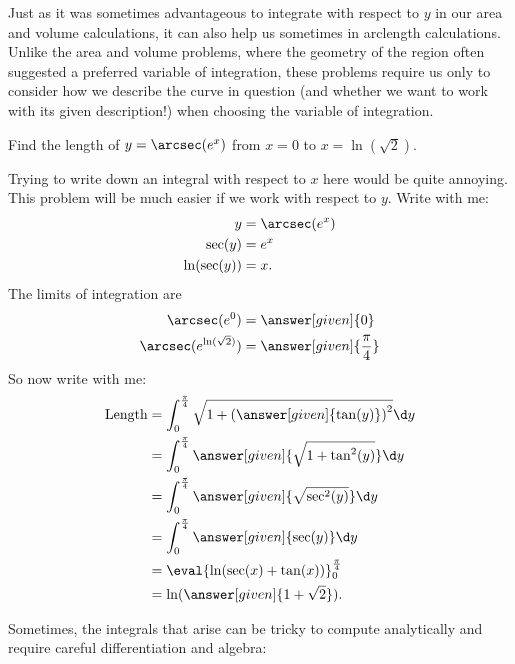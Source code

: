 \documentclass{ximera}
\begin{document}
Just as it was sometimes advantageous to integrate with respect to $y$ in our area and volume calculations, it can also help us sometimes in arclength calculations.  Unlike the area and volume problems, where the geometry of the region often suggested a preferred variable of integration, these problems require us only to consider how we describe the curve in question (and whether we want to work with its given description!) when choosing the variable of integration.
 
\begin{example}
  Find the length of $y = \arcsec(e^x)$ from $x= 0$ to
  $x=\ln(\sqrt{2})$.
  \begin{explanation}
    Trying to write down an integral with respect to $x$ here would be quite annoying.  This problem will be much easier if we work with respect to $y$. Write with me:
    \begin{align*}
      y &= \arcsec(e^x)\\
      \sec(y) &= e^x\\
      \ln(\sec(y)) &= x.
    \end{align*}
    The limits of integration are
    \begin{align*}
      \arcsec(e^0) &= \answer[given]{0}\\
      \arcsec(e^{\ln(\sqrt{2})}) &= \answer[given]{\frac{\pi}{4}}
    \end{align*}
    So now write with me:
    \begin{align*}
      \text{Length} &= \int_0^{\frac{\pi}{4}} \sqrt{1+\left( \answer[given]{\tan(y)} \right)^2} \d y\\
      &=\int_0^{\frac{\pi}{4}} \answer[given]{\sqrt{1+\tan^2(y)}}\d y\\
      &=\int_0^{\frac{\pi}{4}} \answer[given]{\sqrt{\sec^2(y)}}\d y\\
      &=\int_0^{\frac{\pi}{4}} \answer[given]{\sec(y)} \d y\\
      &=\eval{\ln(\sec(x)+\tan(x))}_0^\frac{\pi}{4}\\
      &=\ln(\answer[given]{1+\sqrt{2}}).
    \end{align*}
  \end{explanation}
\end{example}

Sometimes, the integrals that arise can be tricky to compute analytically and require careful differentiation and algebra:
\end{document}
